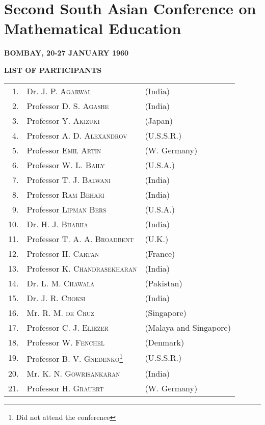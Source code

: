 \chapter{Second South Asian Conference on Mathematical Education}

\begin{center}
{\bf BOMBAY, 20-27 JANUARY 1960}
\medskip

{\large\bf LIST OF PARTICIPANTS}
\end{center}

\setcounter{pageoriginal}{202}
\pageoriginale
\renewcommand{\arraystretch}{1.2}
\begin{longtable}{r@{\;\,}ll}
1. & Dr. \textsc{J. P. Agarwal} & (India)\\
2. & Professor \textsc{D. S. Agashe} & (India)\\
3. & Professor \textsc{Y. Akizuki} & (Japan)\\
4. & Professor \textsc{A. D. Alexandrov} & (U.S.S.R.)\\
5. & Professor \textsc{Emil Artin} & (W. Germany)\\
6. & Professor \textsc{W. L. Baily} & (U.S.A.)\\
7. & Professor \textsc{T. J. Balwani} & (India)\\
8. & Professor \textsc{Ram Behari} & (India)\\
9. & Professor \textsc{Lipman Bers} & (U.S.A.)\\
10. & Dr. \textsc{H. J. Bhabha} & (India)\\
11. & Professor \textsc{T. A. A. Broadbent} & (U.K.)\\
12. & Professor \textsc{H. Cartan} & (France)\\
13. & Professor \textsc{K. Chandrasekharan} & (India)\\
14. & Dr. \textsc{L. M. Chawala} & (Pakistan)\\
15. & Dr. \textsc{J. R. Choksi} & (India)\\
16. & Mr. \textsc{R. M. de Cruz} & (Singapore)\\
17. & Professor \textsc{C. J. Eliezer} & (Malaya and Singapore)\\
18. & Professor \textsc{W. Fenchel} & (Denmark)\\
19. & Professor \textsc{B. V. Gnedenko}\footnote{Did not attend the conference} & (U.S.S.R.)\\
20. & Mr. \textsc{K. N. Gowrisankaran} & (India)\\
21. & Professor \textsc{H. Grauert} & (W. Germany)\\

\end{longtable}
